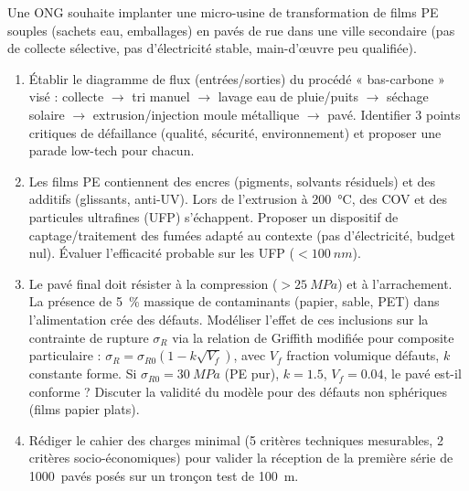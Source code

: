 \documentclass[11pt]{article}
\begin{document}
\begin{exercice}
Une ONG souhaite implanter une micro-usine de transformation de films PE souples (sachets eau, emballages) en pavés de rue dans une ville secondaire (pas de collecte sélective, pas d'électricité stable, main-d'œuvre peu qualifiée).
\begin{enumerate}
    \item Établir le diagramme de flux (entrées/sorties) du procédé « bas-carbone » visé : collecte $\to$ tri manuel $\to$ lavage eau de pluie/puits $\to$ séchage solaire $\to$ extrusion/injection moule métallique $\to$ pavé. Identifier 3 points critiques de défaillance (qualité, sécurité, environnement) et proposer une parade low-tech pour chacun.
    \item Les films PE contiennent des encres (pigments, solvants résiduels) et des additifs (glissants, anti-UV). Lors de l'extrusion à \SI{200}{\celsius}, des COV et des particules ultrafines (UFP) s'échappent. Proposer un dispositif de captage/traitement des fumées adapté au contexte (pas d'électricité, budget nul). Évaluer l'efficacité probable sur les UFP ($< \SI{100}{nm}$).
    \item Le pavé final doit résister à la compression ($> \SI{25}{MPa}$) et à l'arrachement. La présence de \SI{5}{\%} massique de contaminants (papier, sable, PET) dans l'alimentation crée des défauts. Modéliser l'effet de ces inclusions sur la contrainte de rupture $\sigma_R$ via la relation de Griffith modifiée pour composite particulaire : $\sigma_R = \sigma_{R0} (1 - k \sqrt{V_f})$, avec $V_f$ fraction volumique défauts, $k$ constante forme. Si $\sigma_{R0} = \SI{30}{MPa}$ (PE pur), $k=1.5$, $V_f=0.04$, le pavé est-il conforme ? Discuter la validité du modèle pour des défauts non sphériques (films papier plats).
    \item Rédiger le cahier des charges minimal (5 critères techniques mesurables, 2 critères socio-économiques) pour valider la réception de la première série de 1000~pavés posés sur un tronçon test de \SI{100}{m}.
\end{enumerate}
\end{exercice}
\end{document}
